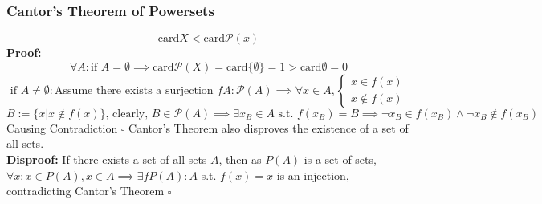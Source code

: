 \documentclass{article}
\newcommand{\0}{{\bf{0}}}
\begin{document}
\subsubsection{Cantor's Theorem of Powersets}
$$\mbox{card}X<\mbox{card}\mathcal{P}(x)$$
{\textbf{Proof:}}
$$\forall{}A:
\mbox{if }A=\emptyset\implies{}\mbox{card}\mathcal{P}(X)=\mbox{card}\{\emptyset\}=1>\mbox{card}\emptyset=0{}$$
$$\mbox{if }A\neq\emptyset:\mbox{Assume there exists a surjection }fA:\mathcal{P}(A)\implies\forall{}x\in{}A,
    \begin{cases}
        x\in{}f(x)\\
        x\notin{}f(x)
    \end{cases}$$
$$B:=\{x|x\notin{}f(x)\}\mbox{, clearly, }B\in{}\mathcal{P}(A)\implies\exists{}x_B\in{}A\mbox{ s.t. }f(x_B)=B\implies{}\neg{}x_B\in{}f(x_B)\land\neg{}x_B\notin{}f(x_B)$$
Causing Contradiction $\square$
Cantor's Theorem also disproves the existence of a set of all sets.\\
{\textbf{Disproof:}}
If there exists a set of all sets $A$, then as $P(A)$ is a set of sets, $\forall{}x:x\in{}P(A),x\in{}A\implies\exists{}fP(A):A$ s.t. $f(x)=x$ is an injection, contradicting Cantor's Theorem $\square$
\end{document}
